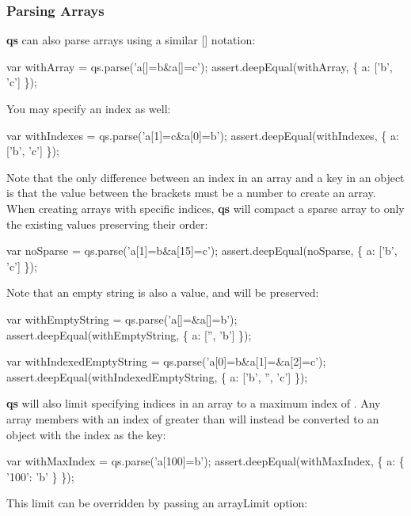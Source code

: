 \subsubsection*{Parsing Arrays}

{\bfseries qs} can also parse arrays using a similar {\ttfamily \mbox{[}\mbox{]}} notation\+:


\begin{DoxyCode}
var withArray = qs.parse('a[]=b&a[]=c');
assert.deepEqual(withArray, \{ a: ['b', 'c'] \});
\end{DoxyCode}


You may specify an index as well\+:


\begin{DoxyCode}
var withIndexes = qs.parse('a[1]=c&a[0]=b');
assert.deepEqual(withIndexes, \{ a: ['b', 'c'] \});
\end{DoxyCode}


Note that the only difference between an index in an array and a key in an object is that the value between the brackets must be a number to create an array. When creating arrays with specific indices, {\bfseries qs} will compact a sparse array to only the existing values preserving their order\+:


\begin{DoxyCode}
var noSparse = qs.parse('a[1]=b&a[15]=c');
assert.deepEqual(noSparse, \{ a: ['b', 'c'] \});
\end{DoxyCode}


Note that an empty string is also a value, and will be preserved\+:


\begin{DoxyCode}
var withEmptyString = qs.parse('a[]=&a[]=b');
assert.deepEqual(withEmptyString, \{ a: ['', 'b'] \});

var withIndexedEmptyString = qs.parse('a[0]=b&a[1]=&a[2]=c');
assert.deepEqual(withIndexedEmptyString, \{ a: ['b', '', 'c'] \});
\end{DoxyCode}


{\bfseries qs} will also limit specifying indices in an array to a maximum index of {}. Any array members with an index of greater than {} will instead be converted to an object with the index as the key\+:


\begin{DoxyCode}
var withMaxIndex = qs.parse('a[100]=b');
assert.deepEqual(withMaxIndex, \{ a: \{ '100': 'b' \} \});
\end{DoxyCode}


This limit can be overridden by passing an {\ttfamily array\+Limit} option\+:


